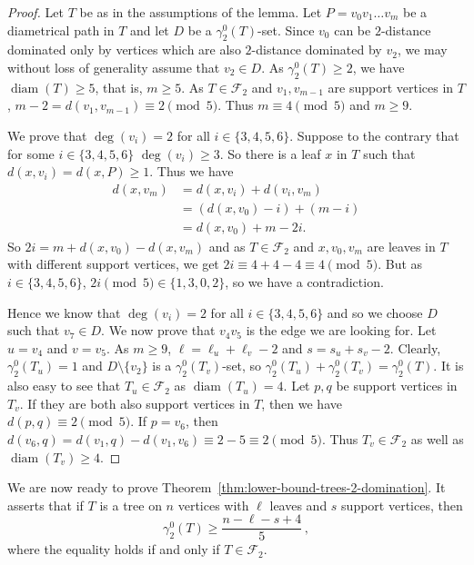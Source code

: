 \documentclass[12pt]{article}
\DeclareMathOperator{\diam}{diam}
\newcommand{\F}{\mathcal{F}}
\begin{document}
\begin{proof}
    Let $T$ be as in the assumptions of the lemma. Let $P = v_0 v_1 \ldots v_m$ be a diametrical path in $T$ and let $D$ be a $\gamma_2^0(T)$-set. Since $v_0$ can be $2$-distance dominated only by vertices which are also $2$-distance dominated by $v_2$, we may without loss of generality assume that $v_2\in D$. As $\gamma_2^0(T) \geq 2$, we have $\diam(T) \geq 5$, that is, $m \geq 5$. As $T \in \F_2$ and $v_1, v_{m-1}$ are support vertices in $T$, $m-2= d(v_1, v_{m-1}) \equiv 2 \pmod{5}$. Thus $m \equiv 4 \pmod{5}$ and $m \geq 9$. 

    We prove that $\deg(v_i) = 2$ for all $i \in \{3,4,5,6\}$. Suppose to the contrary that for some $i \in \{3,4,5,6\}$ $\deg(v_i) \geq 3$. So there is a leaf $x$ in $T$ such that $d(x,v_i) = d(x,P) \geq 1$. Thus we have
    \begin{align*}
        d(x, v_m) & = d(x, v_i) + d(v_i, v_m) \\
        & = (d(x, v_0) - i) + (m - i)\\
        & = d(x, v_0) + m - 2i.
    \end{align*}
    So $2i = m + d(x, v_0) - d(x, v_m)$ and as $T \in \F_2$ and $x, v_0, v_m$ are leaves in $T$ with different support vertices, we get $2i \equiv 4 + 4 - 4 \equiv 4 \pmod{5}$. But as $i \in \{3,4,5,6\}$, $2i \pmod{5} \in \{1,3,0,2\}$, so we have a contradiction.

    Hence we know that $\deg(v_i) = 2$ for all $i \in \{3,4,5,6\}$ and so we choose $D$ such that $v_7 \in D$. We now prove that $v_4 v_5$ is the edge we are looking for. Let $u = v_4$ and $v=v_5$. As $m \geq 9$, $\ell = \ell_u + \ell_v - 2$ and $s = s_u + s_v - 2$. Clearly, $\gamma_2^0(T_u) = 1$ and $D \setminus \{v_2\}$ is a $\gamma_2^0(T_v)$-set, so $\gamma_2^0(T_u) + \gamma_2^0(T_v) = \gamma_2^0(T)$. It is also easy to see that $T_u \in \F_2$ as $\diam(T_u) = 4$. Let $p,q$ be support vertices in $T_v$. If they are both also support vertices in $T$, then we have $d(p,q) \equiv 2 \pmod{5}$. If $p = v_6$, then $d(v_6, q) = d(v_1, q) - d(v_1, v_6) \equiv 2 - 5 \equiv 2 \pmod{5}$. Thus $T_v \in \F_2$ as well as $\diam(T_v) \geq 4$.
\end{proof}

We are now ready to prove Theorem~\ref{thm:lower-bound-trees-2-domination}. It asserts that if $T$ is a tree on $n$ vertices with $\ell$ leaves and $s$ support vertices, then $$\gamma_2^0(T) \geq \frac{n-\ell-s+4}{5}\,,$$ 
where the equality holds if and only if $T\in \F_2$.
\end{document}
